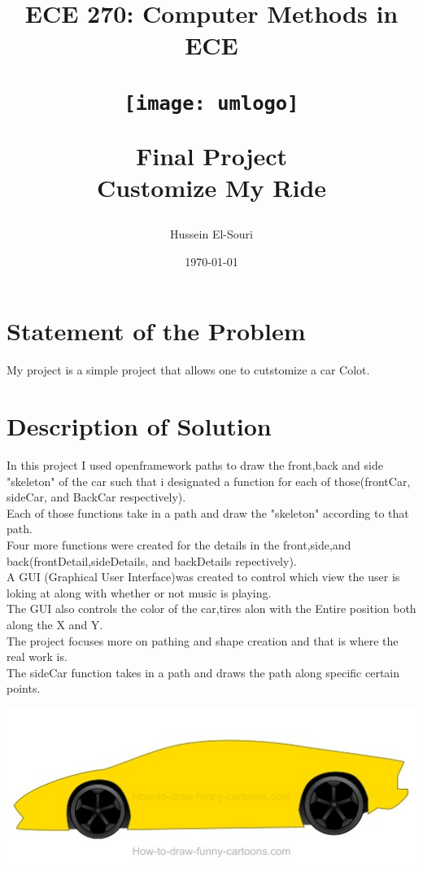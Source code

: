 \documentclass[letterpaper, 24pt, final, onecolumn, titlepage] {article}
\title{ECE 270: Computer Methods in ECE \\
	\vspace{1.5cm}
   		\begin{center}\texttt{[image: umlogo]} \end{center}
	\vspace{1.5cm}
	\textbf{Final Project} \\
	Customize My Ride}
\author{Hussein El-Souri}
\date{\today}
\begin{document}
\maketitle

\doublespacing

\section{Statement of the Problem}

My project is a simple project that allows one to cutstomize a car Colot.

\section{Description of Solution}

In this project I used openframework paths to draw the front,back and side "skeleton" of the car such that i designated a function for each of those(frontCar, sideCar, and BackCar respectively).\\
Each of those functions take in a path and draw the "skeleton" according to that path.\\
Four more functions were created for the details in the front,side,and back(frontDetail,sideDetails, and backDetails repectively).\\
A GUI (Graphical User Interface)was created to control which view the user is loking at along with whether or not music is playing.\\
The GUI also controls the color of the car,tires alon with the Entire position both along the X and Y.\\
The project focuses more on pathing and shape creation and that is where the real work is.\\
The sideCar function takes in a path and draws the path along specific certain points.\\
\begin{center}\includegraphics{sideDesign} \end{center}
\end{document}
